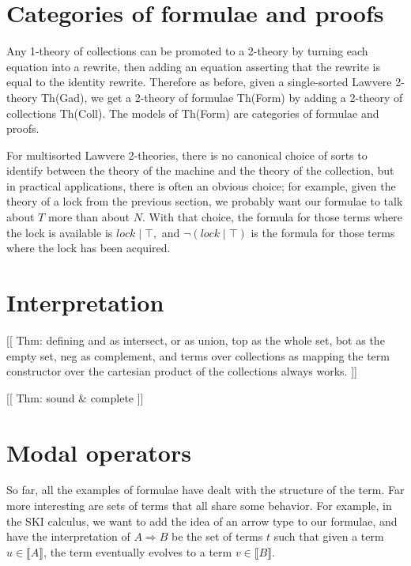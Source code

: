 \documentclass{article}
\newcommand{\interp}[1]{\llbracket #1 \rrbracket}
\newcommand{\lhom}{\Rightarrow}
\begin{document}
\section{Categories of formulae and proofs}

Any 1-theory of collections can be promoted to a 2-theory by turning each equation into a rewrite, then adding an equation asserting that the rewrite is equal to the identity rewrite.  Therefore as before, given a single-sorted Lawvere 2-theory Th(Gad), we get a 2-theory of formulae Th(Form) by adding a 2-theory of collections Th(Coll).  The models of Th(Form) are categories of formulae and proofs.

For multisorted Lawvere 2-theories, there is no canonical choice of sorts to identify between the theory of the machine and the theory of the collection, but in practical applications, there is often an obvious choice; for example, given the theory of a lock from the previous section, we probably want our formulae to talk about $T$ more than about $N$.  With that choice, the formula for those terms where the lock is available is $lock\;|\;\top,$ and $\neg(lock \;|\;\top)$ is the formula for those terms where the lock has been acquired.

\section{Interpretation}

[[ Thm: defining and as intersect, or as union, top as the whole set, bot as the empty set, neg as complement, and terms over collections as mapping the term constructor over the cartesian product of the collections always works. ]]

[[ Thm: sound & complete ]]

\section{Modal operators}

So far, all the examples of formulae have dealt with the structure of the term.  Far more interesting are sets of terms that all share some behavior.  For example, in the SKI calculus, we want to add the idea of an arrow type to our formulae, and have the interpretation of $A \lhom B$ be the set of terms $t$ such that given a term $u\in\interp{A}$, the term eventually evolves to a term $v\in\interp{B}.$
\end{document}

